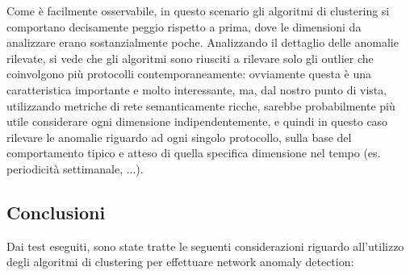 \documentclass[12pt,a4paper,cucitura]{toptesi}
\begin{document}
Come è facilmente osservabile, in questo scenario gli algoritmi di clustering si comportano decisamente peggio rispetto a prima, dove le dimensioni da analizzare erano sostanzialmente poche.
Analizzando il dettaglio delle anomalie rilevate, si vede che gli algoritmi sono riusciti a rilevare solo gli outlier che coinvolgono più protocolli contemporaneamente: ovviamente questa è una caratteristica importante e molto interessante, ma, dal nostro punto di vista, utilizzando metriche di rete semanticamente ricche, sarebbe probabilmente più utile considerare ogni dimensione indipendentemente, e quindi in questo caso rilevare le anomalie riguardo ad ogni singolo protocollo, sulla base del comportamento tipico e atteso di quella specifica dimensione nel tempo (es. periodicità settimanale, ...).

\subsection{Conclusioni}

Dai test eseguiti, sono state tratte le seguenti considerazioni riguardo all'utilizzo degli algoritmi di clustering per effettuare network anomaly detection:
\end{document}
